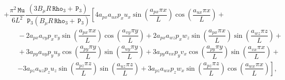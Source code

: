 \documentclass[10pt]{article}
\newcommand{\Rho}{\,\mathtt{Rho}}
\newcommand{\PP}{\,\mathtt{P}}
\newcommand{\MU}{\,\mathtt{Mu}}
\begin{document}
\begin{equation}
\begin{split}
%
&+  \dfrac{ \pi^2 \MU}{6L^2}\dfrac{(3 B_\mu R \Rho_3+\PP_3)}{\PP_3  (B_\mu R \Rho_3+\PP_3) }\left[4 a_{px} a_{ux} p_x u_x \sin\left(\dfrac{a_{px} \pi x}{L}\right) \cos\left(\dfrac{a_{ux} \pi x}{L}\right)\right.+\\
    &\qquad-2 a_{px} a_{vy} p_x v_y \sin\left(\dfrac{a_{px} \pi x}{L}\right) \cos\left(\dfrac{a_{vy} \pi y}{L}\right)+2 a_{px} a_{wz} p_x w_z \sin\left(\dfrac{a_{px} \pi x}{L}\right) \sin\left(\dfrac{a_{wz} \pi z}{L}\right)+\\
    &\qquad+3 a_{py} a_{uy} p_y u_y \cos\left(\dfrac{a_{py} \pi y}{L}\right) \sin\left(\dfrac{a_{uy} \pi y}{L}\right)+3 a_{py} a_{vx} p_y v_x \cos\left(\dfrac{a_{py} \pi y}{L}\right) \sin\left(\dfrac{a_{vx} \pi x}{L}\right)+\\
    &\qquad\left.-3 a_{pz}a_{uz}  p_z u_z \sin\left(\dfrac{a_{pz} \pi z}{L}\right) \sin\left(\dfrac{a_{uz} \pi z}{L}\right)+3 a_{pz}  a_{wx} p_z w_x \sin\left(\dfrac{a_{pz} \pi z}{L}\right) \cos\left(\dfrac{a_{wx} \pi x}{L}\right)\right]
,
 \end{split}
\end{equation}
\end{document}

